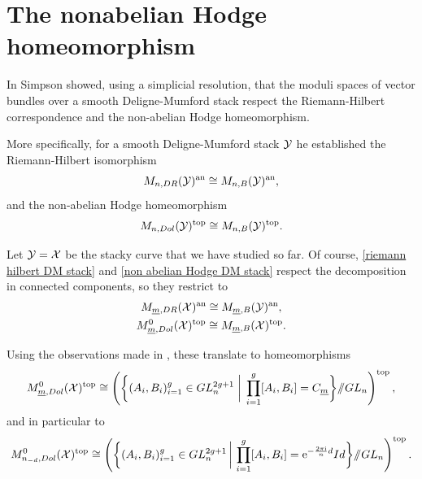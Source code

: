 \section{The nonabelian Hodge homeomorphism} \label{section: The nonabelian Hodge homeomorphism}

In \cite[\S 8,9]{simpson-local_systems_on_proper} Simpson showed, using a simplicial resolution, that the moduli spaces of vector bundles over a smooth Deligne-Mumford stack respect the Riemann-Hilbert correspondence and the non-abelian Hodge homeomorphism.

More specifically, for a smooth Deligne-Mumford stack $\mathcal{Y}$ he established the Riemann-Hilbert isomorphism
\begin{equation} \label{riemann hilbert DM stack}
M_{n, DR}(\mathcal{Y})^{\text{an}} \cong M_{n, B}(\mathcal{Y})^{\text{an}},
\end{equation}
and the non-abelian Hodge homeomorphism
\begin{equation}\label{non abelian Hodge DM stack}
M_{n, Dol}(\mathcal{Y})^{\text{top}} \cong M_{n, B}(\mathcal{Y})^{\text{top}}.
\end{equation}

Let $\mathcal{Y} = \mathcal{X}$ be the stacky curve that we have studied so far. Of course, \eqref{riemann hilbert DM stack} and \eqref{non abelian Hodge DM stack} respect the decomposition in connected components, so they restrict to
\begin{gather}
M_{\underline{m}, DR}(\mathcal{X})^{\text{an}} \cong M_{\underline{m}, B}(\mathcal{Y})^{\text{an}}, \\
M_{\underline{m}, Dol}^0(\mathcal{X})^{\text{top}} \cong M_{\underline{m}, B}(\mathcal{X})^{\text{top}}.
\end{gather}

Using the observations made in , these translate to homeomorphisms
\begin{equation}
M_{\underline{m}, Dol}^0(\mathcal{X})^{\text{top}} \cong \left( \bigg\{ (A_i, B_i)_{i = 1}^g \in GL_n^{2g +1} \;\bigg|\; \prod_{i=1}^{g}[A_i, B_i] = C_{\underline{m}} \bigg\} /\!\!/ GL_n \right)^{\text{top}},
\end{equation}
and in particular to
\begin{equation}
M_{n_{-d}, Dol}^0(\mathcal{X})^{\text{top}} \cong \left( \bigg\{ (A_i, B_i)_{i = 1}^g \in GL_n^{2g +1} \,\bigg|\, \prod_{i=1}^{g}[A_i, B_i] = \mathrm{e}^{-\frac{2 \pi \mathrm{i}}{n} d} Id \bigg\} /\!\!/ GL_n \right)^{\text{top}}.
\end{equation}

